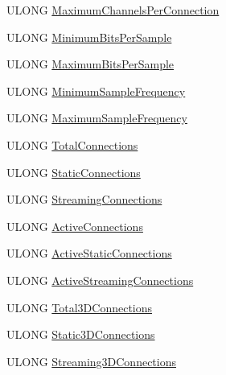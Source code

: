 \begin{DoxyCompactItemize}
\item 
U\+L\+O\+NG \hyperlink{struct_k_s_w_a_v_e___o_u_t_p_u_t___c_a_p_a_b_i_l_i_t_i_e_s_a298a519ac95e4e51fab52fa331affdc9}{Maximum\+Channels\+Per\+Connection}
\item 
U\+L\+O\+NG \hyperlink{struct_k_s_w_a_v_e___o_u_t_p_u_t___c_a_p_a_b_i_l_i_t_i_e_s_a21e19375b95132147ca910fd62b8097e}{Minimum\+Bits\+Per\+Sample}
\item 
U\+L\+O\+NG \hyperlink{struct_k_s_w_a_v_e___o_u_t_p_u_t___c_a_p_a_b_i_l_i_t_i_e_s_a83e7f7eb5a46186f72c57f70a7585da2}{Maximum\+Bits\+Per\+Sample}
\item 
U\+L\+O\+NG \hyperlink{struct_k_s_w_a_v_e___o_u_t_p_u_t___c_a_p_a_b_i_l_i_t_i_e_s_a121cf214fad03f667c381e4e4287a913}{Minimum\+Sample\+Frequency}
\item 
U\+L\+O\+NG \hyperlink{struct_k_s_w_a_v_e___o_u_t_p_u_t___c_a_p_a_b_i_l_i_t_i_e_s_a2ecc830540bed57379228dc2528fbf5b}{Maximum\+Sample\+Frequency}
\item 
U\+L\+O\+NG \hyperlink{struct_k_s_w_a_v_e___o_u_t_p_u_t___c_a_p_a_b_i_l_i_t_i_e_s_a3c99e536331f4dd220875d846621069d}{Total\+Connections}
\item 
U\+L\+O\+NG \hyperlink{struct_k_s_w_a_v_e___o_u_t_p_u_t___c_a_p_a_b_i_l_i_t_i_e_s_af132ce42ee9e7417f7a105af02596dfb}{Static\+Connections}
\item 
U\+L\+O\+NG \hyperlink{struct_k_s_w_a_v_e___o_u_t_p_u_t___c_a_p_a_b_i_l_i_t_i_e_s_a3738f1b3f5a676592720c5c790aa6c81}{Streaming\+Connections}
\item 
U\+L\+O\+NG \hyperlink{struct_k_s_w_a_v_e___o_u_t_p_u_t___c_a_p_a_b_i_l_i_t_i_e_s_aa166f4d8db327b7717f11d1dc06adbec}{Active\+Connections}
\item 
U\+L\+O\+NG \hyperlink{struct_k_s_w_a_v_e___o_u_t_p_u_t___c_a_p_a_b_i_l_i_t_i_e_s_a9c065a8c2e711ba76cff7a0186282566}{Active\+Static\+Connections}
\item 
U\+L\+O\+NG \hyperlink{struct_k_s_w_a_v_e___o_u_t_p_u_t___c_a_p_a_b_i_l_i_t_i_e_s_af6db05c084a4f219609c9d9b37c53ee6}{Active\+Streaming\+Connections}
\item 
U\+L\+O\+NG \hyperlink{struct_k_s_w_a_v_e___o_u_t_p_u_t___c_a_p_a_b_i_l_i_t_i_e_s_a591fa35a370d323b11e4598c39d71994}{Total3\+D\+Connections}
\item 
U\+L\+O\+NG \hyperlink{struct_k_s_w_a_v_e___o_u_t_p_u_t___c_a_p_a_b_i_l_i_t_i_e_s_a1ea5f96f463a7b80583df651d0354748}{Static3\+D\+Connections}
\item 
U\+L\+O\+NG \hyperlink{struct_k_s_w_a_v_e___o_u_t_p_u_t___c_a_p_a_b_i_l_i_t_i_e_s_a9a3bbef7dfa276490e5813a5aca2cea9}{Streaming3\+D\+Connections}

\end{DoxyCompactItemize}
